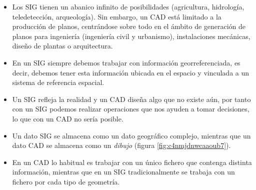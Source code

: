 \begin{itemize}
	
	\item Los SIG tienen un abanico infinito de posibilidades (agricultura, hidrología, teledetección, arqueología). Sin embargo, un CAD está limitado a la producción de planos, centrándose sobre todo en el ámbito de generación de planos para ingeniería (ingeniería civil y urbanismo), instalaciones mecánicas, diseño de plantas o arquitectura.
	
	\item En un SIG siempre debemos trabajar con información georreferenciada, es decir, debemos tener esta información ubicada en el espacio y vinculada a un sistema de referencia espacial.
	
	
	
	\item Un SIG refleja la realidad y un CAD diseña algo que no existe aún, por tanto con un SIG podemos realizar operaciones que nos ayuden a tomar decisiones, lo que con un CAD no sería posible.
	
	\item Un dato SIG se almacena como un dato geográfico complejo, mientras que un dato CAD se almacena como un \textit{dibujo} (figura \ref{fig:c4nmjdnwcaaoub7}).
	
	\item En un CAD lo habitual es trabajar con un único fichero que contenga distinta información, mientras que en un SIG tradicionalmente se trabaja con un fichero por cada tipo de geometría.
	
\end{itemize}



